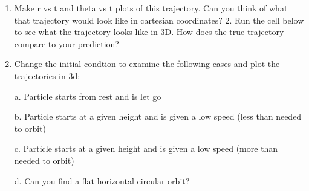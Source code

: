 \documentclass[letterpaper,10pt,english]{jupyterBook}
\begin{document}
\sphinxAtStartPar
{}
\begin{enumerate}
%
\item {} 
\sphinxAtStartPar
Make r vs t and theta vs t plots of this trajectory. Can you think of what that trajectory would look like in cartesian coordinates? 2. Run the cell below to see what the trajectory looks like in 3D. How does the true trajectory compare to your prediction?

\item {} 
\sphinxAtStartPar
Change the initial condtion to examine the following cases and plot the trajectories in 3d:

\sphinxAtStartPar
a. Particle starts from rest and is let go

\sphinxAtStartPar
b. Particle starts at a given height and is given a low speed (less than needed to orbit)

\sphinxAtStartPar
c. Particle starts at a given height and is given a low speed (more than needed to orbit)

\sphinxAtStartPar
d. Can you find a flat horizontal circular orbit?

\end{enumerate}
\end{document}
